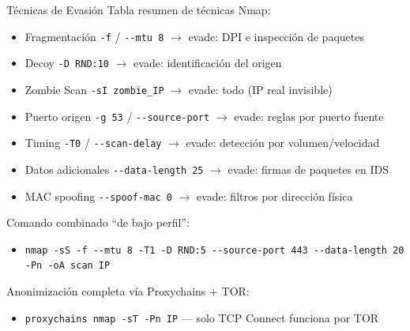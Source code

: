 \documentclass[aspectratio=169,11pt]{beamer}
\begin{document}
\begin{frame}{Técnicas de Evasión}
\small
Tabla resumen de técnicas Nmap:
  \begin{itemize}
  \item Fragmentación \verb|-f| / \verb|--mtu 8| $\rightarrow$ evade: DPI e inspección de paquetes
  \item Decoy \verb|-D RND:10| $\rightarrow$ evade: identificación del origen
  \item Zombie Scan \verb|-sI zombie_IP| $\rightarrow$ evade: todo (IP real invisible)
  \item Puerto origen \verb|-g 53| / \verb|--source-port| $\rightarrow$ evade: reglas por puerto fuente
  \item Timing \verb|-T0| / \verb|--scan-delay| $\rightarrow$ evade: detección por volumen/velocidad
  \item Datos adicionales \verb|--data-length 25| $\rightarrow$ evade: firmas de paquetes en IDS
  \item MAC spoofing \verb|--spoof-mac 0| $\rightarrow$ evade: filtros por dirección física
  \end{itemize}
\medskip
Comando combinado ``de bajo perfil'':
  \begin{itemize}
  \item {\scriptsize\verb|nmap -sS -f --mtu 8 -T1 -D RND:5 --source-port 443 --data-length 20 -Pn -oA scan IP|}
  \end{itemize}
Anonimización completa vía Proxychains + TOR:
  \begin{itemize}
  \item \verb|proxychains nmap -sT -Pn IP| --- solo TCP Connect funciona por TOR
  \end{itemize}
\end{frame}
\end{document}
